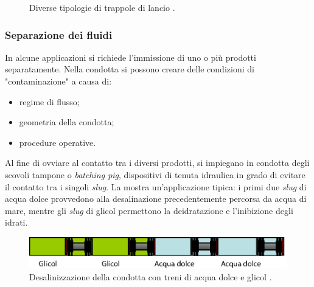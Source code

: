 \begin{figure}[htbp]
\caption{Diverse tipologie di trappole di lancio \parencite{williamson2015guide}.}
\label{fig:displacement-tools}
\end{figure} 
 
\subsubsection{Separazione dei fluidi}
In alcune applicazioni si richiede l'immissione di uno o più prodotti separatamente. Nella condotta si possono creare delle condizioni di "contaminazione" a causa di:
\begin{itemize}
	\item regime di flusso;
	\item geometria della condotta;
	\item procedure operative.
\end{itemize}
Al fine di ovviare al contatto tra i diversi prodotti, si impiegano in condotta degli scovoli tampone o \textit{batching pig}, dispositivi di tenuta idraulica in grado di evitare il contatto tra i singoli \textit{slug}. La  mostra un'applicazione tipica: i primi due \textit{slug} di acqua dolce provvedono alla desalinazione precedentemente percorsa da acqua di mare, mentre gli \textit{slug} di glicol permettono la deidratazione e l'inibizione degli idrati.

\begin{figure}[htbp]
	\centering
	\includegraphics[width=\textwidth]{fig/pig/batching.eps}
	\caption{Desalinizzazione della condotta con treni di acqua dolce e glicol \parencite{davidson2002introduction}.}
	\label{fig:batching}
\end{figure}

